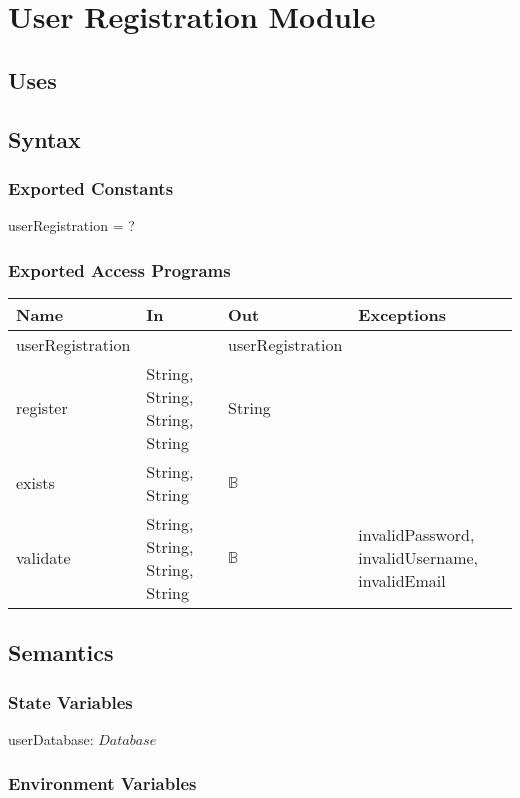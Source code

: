 \documentclass[12pt, titlepage]{article}
\begin{document}
\section{User Registration Module}

\subsection{Uses}

\subsection{Syntax}

\subsubsection{Exported Constants}
userRegistration = ?
\subsubsection{Exported Access Programs}

\begin{center}
	\begin{tabular}{p{4cm} p{4cm} p{4cm} p{4cm}}
		\hline
		\textbf{Name} & \textbf{In} & \textbf{Out} & \textbf{Exceptions} \\
		\hline
		userRegistration &  & userRegistration &  \\
		register & String, String, String, String & String &  \\
		exists & String, String & $\mathbb{B}$ & \\
		validate & String, String, String, String & $\mathbb{B}$ & invalidPassword, invalidUsername, invalidEmail\\
		\hline
	\end{tabular}
\end{center}

\subsection{Semantics}

\subsubsection{State Variables}
userDatabase: $Database$

\subsubsection{Environment Variables}
\end{document}
